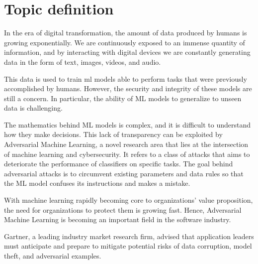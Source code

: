 \section{Topic definition}\label{sec:topic-definition}

In the era of digital transformation, the amount of data produced by humans is growing exponentially. 
We are continuously exposed to an immense quantity of information, and by interacting with digital devices we are constantly generating data
in the form of text, images, videos, and audio.

This data is used to train \acrfull{ml} models able to perform tasks that were previously accomplished by humans. 
However, the security and integrity of these models are still a concern. 
In particular, the ability of ML models to generalize to unseen data is challenging. 

The mathematics behind ML models is complex, and it is difficult to understand how they make decisions. 
This lack of transparency can be exploited by Adversarial Machine Learning, a novel research area that lies at the intersection of machine learning and cybersecurity.
It refers to a class of attacks that aims to deteriorate the performance of classifiers on specific tasks.
The goal behind adversarial attacks is to circumvent existing parameters and data rules so that the ML model confuses its instructions and makes a mistake.

With machine learning rapidly becoming core to organizations' value proposition, the need for organizations to protect them is growing fast. Hence, Adversarial Machine Learning is becoming an important field in the software industry.

Gartner, a leading industry market research firm, advised that application leaders must anticipate and prepare to mitigate potential risks of data corruption, model theft, and adversarial examples.


